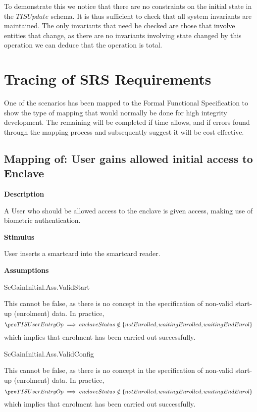 To demonstrate this we notice that there are no constraints on the initial
state in the $TISUpdate$ schema. 
It is thus sufficient to check that all system invariants are
maintained. 
The only invariants that need be checked are those that
involve entities that change, as there are no invariants involving
state changed by this operation we can deduce that the operation is total.


\chapter{Tracing of SRS Requirements}
\label{sec:SRSTrace}

One of the scenarios has been mapped to the Formal Functional Specification to show the type of mapping that would normally be done for high integrity development. The remaining will be completed if time allows, and if errors found through the mapping process and subsequently suggest it will be cost effective.

\section{Mapping of: User gains allowed initial access to Enclave}

{\footnotesize \sf
{\bf Description}

A User who should be allowed access to the enclave is given access, making use of biometric authentication.

{\bf Stimulus}

User inserts a smartcard into the smartcard reader.

{\bf Assumptions}

ScGainInitial.Ass.ValidStart
}

This cannot be false, as there is no concept in the specification of
non-valid start-up (enrolment) data. In practice, 
\[
\pre TISUserEntryOp
\implies enclaveStatus \notin \{notEnrolled, waitingEnrolled,
waitingEndEnrol\} 
\] 
which implies that enrolment has been carried out successfully.

{\footnotesize \sf
ScGainInitial.Ass.ValidConfig
}

This cannot be false, as there is no concept in the specification of
non-valid start-up (enrolment) data. In practice, 
\[
\pre TISUserEntryOp \implies enclaveStatus \notin \{notEnrolled,
waitingEnrolled, waitingEndEnrol\} 
\]
which implies that enrolment has been carried out successfully.


